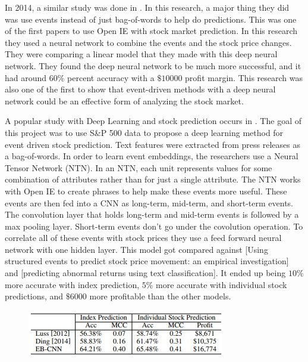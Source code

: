 \documentclass{article}
\theoremstyle{plain}
\theoremstyle{definition}
\numberwithin{equation}{section}
\numberwithin{theorem}{section}
\numberwithin{lemma}{section}
\numberwithin{definition}{section}
\numberwithin{proposition}{section}
\numberwithin{corollary}{section}
\begin{document}
	
	In 2014, a similar study was done in \cite{Ding2014}. In this research, a major thing they did was use events instead of just bag-of-words to help do predictions. This was one of the first papers to use Open IE with stock market prediction. In this research they used a neural network to combine the events and the stock price changes. They were comparing a linear model that they made with this deep neural network. They found the deep neural network to be much more successful, and it had around $60\%$ percent accuracy with a $\$10000$ profit margin. This research was also one of the first to show that event-driven methods with a deep neural network could be an effective form of analyzing the stock market. 
	
	
	A popular study with Deep Learning and stock prediction occurs in \cite{Ding2015DeepLF}. The goal of this project was to use S\&P 500 data to propose a deep learning method for event driven stock prediction. Text features were extracted from press releases as a bag-of-words. In order to learn event embeddings, the researchers use a Neural Tensor Network (NTN). In an NTN, each unit represents values for some combination of attributes rather than for just a single attribute. The NTN works with Open IE to create phrases to help make these events more useful. These events are then fed into a CNN as long-term, mid-term, and short-term events. The convolution layer that holds long-term and mid-term events is followed by a max pooling layer. Short-term events don't go under the covolution operation. To correlate all of these events with stock prices they use a feed forward neural network with one hidden layer. This model got compared against [Using structured events to predict stock price movement: an empirical investigation] and [predicting abnormal returns using text classification]. It ended up being $10\%$ more accurate with index prediction, $5\%$ more accurate with individual stock predictions, and $\$6000$ more profitable than the other models.
	
	\begin{figure}[h]
		\includegraphics[width=\linewidth]{textSeriesResults}
	\end{figure}
	
\end{document}
